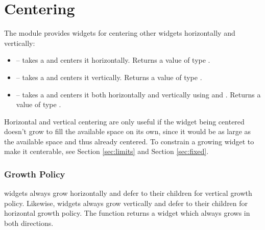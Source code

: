 \section{Centering}
\label{sec:centering}

The  module provides widgets for centering other widgets
horizontally and vertically:

\begin{itemize}
\item {} -- takes a  and centers it
  horizontally.  Returns a value of type .
\item {} -- takes a  and centers it
  vertically.  Returns a value of type .
\item {} -- takes a  and centers it both
  horizontally and vertically using  and .
  Returns a value of type .
\end{itemize}

Horizontal and vertical centering are only useful if the widget being
centered doesn't grow to fill the available space on its own, since it
would be as large as the available space and thus already centered.
To constrain a growing widget to make it centerable, see Section
\ref{sec:limits} and Section \ref{sec:fixed}.

\subsubsection{Growth Policy}

 widgets always grow horizontally and defer to their
children for vertical growth policy.  Likewise,  widgets
always grow vertically and defer to their children for horizontal
growth policy.  The  function returns a widget which
always grows in both directions.
